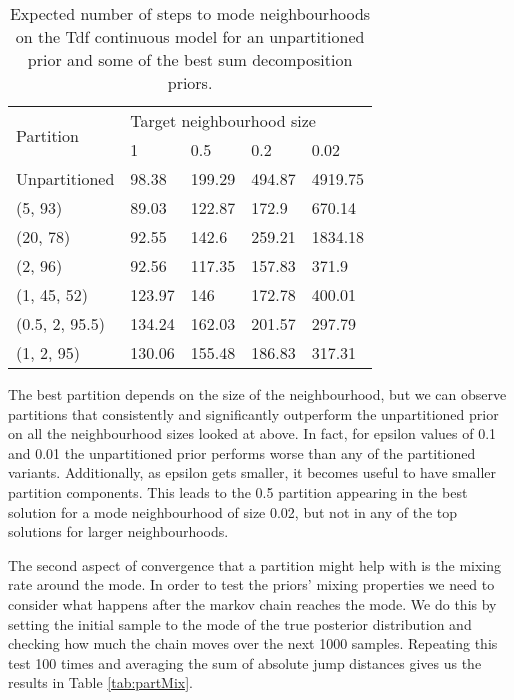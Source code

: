 \begin{table}[h]
  \centering
  \begin{tabular}{lllll}
    \toprule
    \multirow{2}{*}{Partition} & \multicolumn{4}{l}{Target neighbourhood size} \\
    \cmidrule(r){2-5} 
    & 1 & 0.5 & 0.2 & 0.02 \\
    \midrule
    Unpartitioned & 98.38 & 199.29 & 494.87 & 4919.75 \\
    (5, 93) & 89.03 & 122.87 & 172.9  & 670.14 \\
    (20, 78)& 92.55 & 142.6  & 259.21 & 1834.18 \\
    (2, 96) & 92.56 & 117.35 & 157.83 & 371.9 \\
    (1, 45, 52) & 123.97 & 146 & 172.78 & 400.01 \\
    (0.5, 2, 95.5) & 134.24 & 162.03 & 201.57 & 297.79 \\
    (1, 2, 95) & 130.06 & 155.48  & 186.83 & 317.31 \\
    \bottomrule
  \end{tabular}
  \caption{Expected number of steps to mode neighbourhoods on the Tdf continuous model for an unpartitioned prior and some of the best sum decomposition priors.}
  \label{tab:bestParts}
\end{table}

The best partition depends on the size of the neighbourhood, but we can observe partitions that consistently and significantly outperform the unpartitioned prior on all the neighbourhood sizes looked at above. In fact, for epsilon values of 0.1 and 0.01 the unpartitioned prior performs worse than any of the partitioned variants. Additionally, as epsilon gets smaller, it becomes useful to have smaller partition components. This leads to the 0.5 partition appearing in the best solution for a mode neighbourhood of size 0.02, but not in any of the top solutions for larger neighbourhoods.

The second aspect of convergence that a partition might help with is the mixing rate around the mode. In order to test the priors' mixing properties we need to consider what happens after the markov chain reaches the mode. We do this by setting the initial sample to the mode of the true posterior distribution and checking how much the chain moves over the next 1000 samples. Repeating this test 100 times and averaging the sum of absolute jump distances gives us the results in Table \ref{tab:partMix}.

